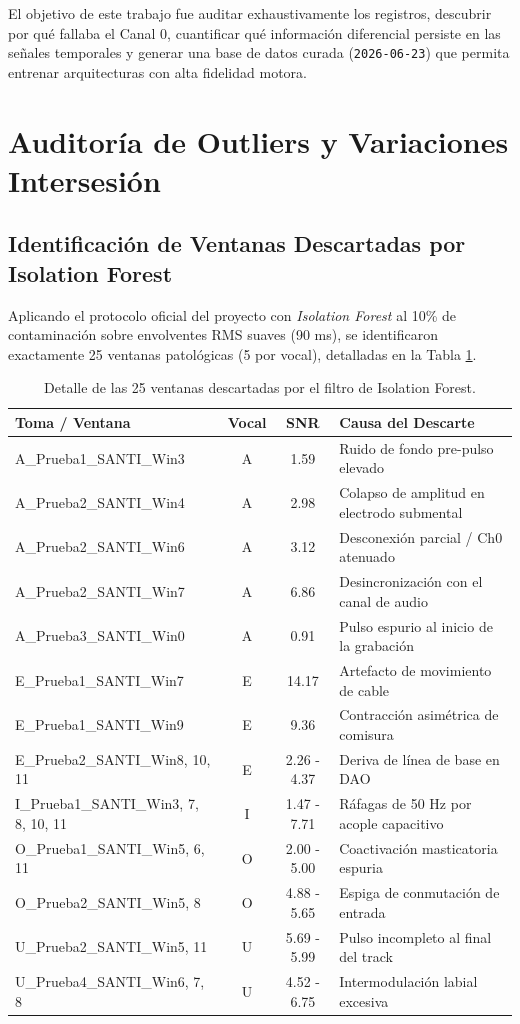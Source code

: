 \documentclass[11pt,a4paper]{article}
\begin{document}
El objetivo de este trabajo fue auditar exhaustivamente los registros, descubrir por qué fallaba el Canal 0, cuantificar qué información diferencial persiste en las señales temporales y generar una base de datos curada (\texttt{2026-06-23}) que permita entrenar arquitecturas con alta fidelidad motora.

\section{Auditoría de Outliers y Variaciones Intersesión}

\subsection{Identificación de Ventanas Descartadas por Isolation Forest}
Aplicando el protocolo oficial del proyecto con \textit{Isolation Forest} al 10\% de contaminación sobre envolventes RMS suaves (90 ms), se identificaron exactamente 25 ventanas patológicas (5 por vocal), detalladas en la Tabla \ref{tab:outliers}.

\begin{table}[H]
\centering
\small
\begin{tabularx}{\textwidth}{l c c X}
\toprule
\textbf{Toma / Ventana} & \textbf{Vocal} & \textbf{SNR} & \textbf{Causa del Descarte} \\
\midrule
A\_Prueba1\_SANTI\_Win3 & A & 1.59 & Ruido de fondo pre-pulso elevado \\
A\_Prueba2\_SANTI\_Win4 & A & 2.98 & Colapso de amplitud en electrodo submental \\
A\_Prueba2\_SANTI\_Win6 & A & 3.12 & Desconexión parcial / Ch0 atenuado \\
A\_Prueba2\_SANTI\_Win7 & A & 6.86 & Desincronización con el canal de audio \\
A\_Prueba3\_SANTI\_Win0 & A & 0.91 & Pulso espurio al inicio de la grabación \\
E\_Prueba1\_SANTI\_Win7 & E & 14.17 & Artefacto de movimiento de cable \\
E\_Prueba1\_SANTI\_Win9 & E & 9.36 & Contracción asimétrica de comisura \\
E\_Prueba2\_SANTI\_Win8, 10, 11 & E & 2.26 - 4.37 & Deriva de línea de base en DAO \\
I\_Prueba1\_SANTI\_Win3, 7, 8, 10, 11 & I & 1.47 - 7.71 & Ráfagas de 50 Hz por acople capacitivo \\
O\_Prueba1\_SANTI\_Win5, 6, 11 & O & 2.00 - 5.00 & Coactivación masticatoria espuria \\
O\_Prueba2\_SANTI\_Win5, 8 & O & 4.88 - 5.65 & Espiga de conmutación de entrada \\
U\_Prueba2\_SANTI\_Win5, 11 & U & 5.69 - 5.99 & Pulso incompleto al final del track \\
U\_Prueba4\_SANTI\_Win6, 7, 8 & U & 4.52 - 6.75 & Intermodulación labial excesiva \\
\bottomrule
\end{tabularx}
\caption{Detalle de las 25 ventanas descartadas por el filtro de Isolation Forest.}
\label{tab:outliers}
\end{table}
\end{document}
